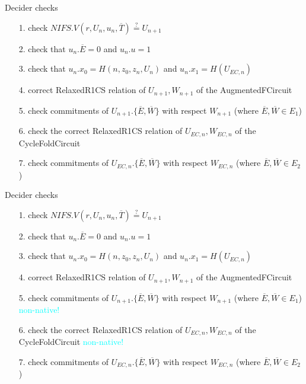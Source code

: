 \documentclass[t]{beamer} \usefonttheme[onlymath]{serif}
\begin{document}
\begin{frame}{Decider checks}
  \begin{enumerate}
    \item[1.] check $NIFS.V(r, U_n, u_n, \overline{T}) \stackrel{?}{=} U_{n+1}$
    \item[2.] check that $u_n.\overline{E}=0$ and $u_n.u=1$
    \item[3.] check that $u_n.x_0 = H(n, z_0, z_n, U_n)$ and $u_n.x_1 = H(U_{EC,n})$
    \item[4.] correct RelaxedR1CS relation of $U_{n+1}, W_{n+1}$ of the AugmentedFCircuit
    \item[5.] check commitments of $U_{n+1}.\{ \overline{E}, \overline{W} \}$ with respect $W_{n+1}$ (where $\overline{E}, \overline{W} \in E_1$)
    \item[6.] check the correct RelaxedR1CS relation of $U_{EC,n}, W_{EC,n}$ of the CycleFoldCircuit
    \item[7.] check commitments of $U_{EC,n}.\{ \overline{E}, \overline{W} \}$ with respect $W_{EC,n}$ (where $\overline{E},\overline{W} \in E_2$)
  \end{enumerate}
\end{frame}

\begin{frame}{Decider checks}
  \begin{enumerate}
    \item[1.] check $NIFS.V(r, U_n, u_n, \overline{T}) \stackrel{?}{=} U_{n+1}$
    \item[2.] check that $u_n.\overline{E}=0$ and $u_n.u=1$
    \item[3.] check that $u_n.x_0 = H(n, z_0, z_n, U_n)$ and $u_n.x_1 = H(U_{EC,n})$
    \item[4.] correct RelaxedR1CS relation of $U_{n+1}, W_{n+1}$ of the AugmentedFCircuit
    \item[5.] check commitments of $U_{n+1}.\{ \overline{E}, \overline{W} \}$ with respect $W_{n+1}$ (where $\overline{E}, \overline{W} \in E_1$) \textcolor{cyan}{non-native!}
    \item[6.] check the correct RelaxedR1CS relation of $U_{EC,n}, W_{EC,n}$ of the CycleFoldCircuit \textcolor{cyan}{non-native!}
    \item[7.] check commitments of $U_{EC,n}.\{ \overline{E}, \overline{W} \}$ with respect $W_{EC,n}$ (where $\overline{E},\overline{W} \in E_2$)
  \end{enumerate}
\end{frame}
\end{document}
